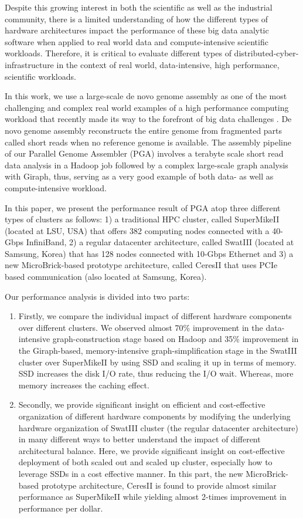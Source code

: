 \documentclass[conference]{IEEEtran}
\begin{document}
Despite this growing interest in both the scientific as well as the industrial community, there is a limited understanding of how the different types of hardware architectures impact the performance of these big data analytic software when applied to real world data and compute-intensive scientific workloads. Therefore, it is critical to evaluate different types of distributed-cyber-infrastructure in the context of real world, data-intensive, high performance, scientific workloads.   

In this work, we use a large-scale de novo genome assembly as one of the most challenging and complex real world examples of a high performance computing workload that recently made its way to the forefront of big data challenges \cite{bigGenome:graphtraverse} \cite{biggenome:kmerpartition}. De novo genome assembly reconstructs the entire genome from fragmented parts called short reads when no reference genome is available. The assembly pipeline of our Parallel Genome Assembler (PGA) involves a terabyte scale short read data analysis in a Hadoop job followed by a complex large-scale graph analysis with Giraph, thus, serving as a very good example of both data- as well as compute-intensive workload.

In this paper, we present the performance result of PGA atop three different types of clusters as follows: 
1) a traditional HPC cluster, called SuperMikeII (located at LSU, USA) that offers 382 computing nodes connected with a 40-Gbps InfiniBand, 
2) a regular datacenter architecture, called SwatIII (located at Samsung, Korea) that has 128 nodes connected with 10-Gbps Ethernet and 
3) a new MicroBrick-based prototype architecture, called CeresII that uses PCIe based communication (also located at Samsung, Korea). 

Our performance analysis is divided into two parts: 
\begin{enumerate}
\item Firstly, we compare the individual impact of different hardware components over different clusters. We observed almost 70\% improvement in the data-intensive graph-construction stage based on Hadoop and 35\% improvement in the Giraph-based, memory-intensive graph-simplification stage in the SwatIII cluster over SuperMikeII by using SSD and scaling it up in terms of memory. SSD increases the disk I/O rate, thus reducing the I/O wait. Whereas, more memory increases the caching effect. 
\item Secondly, we provide significant insight on efficient and cost-effective organization of different hardware components by modifying the underlying hardware organization of SwatIII cluster (the regular datacenter architecture) in many different ways to better understand the impact of different architectural balance. Here, we provide significant insight on cost-effective deployment of both scaled out and scaled up cluster, especially how to leverage SSDs in a cost effective manner. 
In this part, the new MicroBrick-based prototype architecture, CeresII is found to provide almost similar performance as SuperMikeII while yielding almost 2-times improvement in performance per dollar. 
\end{enumerate}
\end{document}
